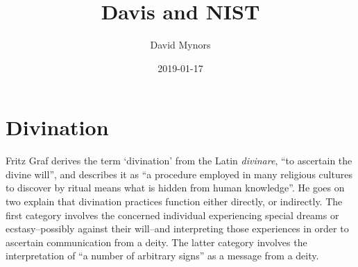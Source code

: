\documentclass{article}
\author{David Mynors}
\title{Davis and NIST}
\date{2019-01-17}
\begin{document}
\section*{Divination}

Fritz Graf \parencite{Divination11} derives the term `divination'
from the Latin \textit{divinare}, ``to ascertain the divine will'',
and describes it as ``a procedure employed in many religious cultures
to discover by ritual means what is hidden from human knowledge''.
He goes on two explain that divination practices function
either directly, or indirectly.
The first category involves the concerned individual experiencing
special dreams or ecstasy--possibly against their will--and interpreting
those experiences in order to ascertain communication from a deity.
The latter category involves the interpretation of
``a number of arbitrary signs'' as a message from a deity.

\clearpage
\printbibliography
\end{document}
